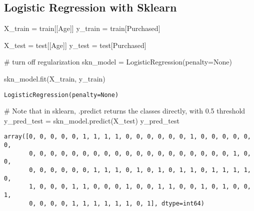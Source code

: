 \documentclass[
  letterpaper,
  DIV=11,
  numbers=noendperiod]{scrreprt}
\newenvironment{Shaded}{\begin{snugshade}}{\end{snugshade}}
\newcommand{\CommentTok}[1]{\textcolor[rgb]{0.37,0.37,0.37}{#1}}
\newcommand{\NormalTok}[1]{\textcolor[rgb]{0.00,0.23,0.31}{#1}}
\newcommand{\OperatorTok}[1]{\textcolor[rgb]{0.37,0.37,0.37}{#1}}
\newcommand{\StringTok}[1]{\textcolor[rgb]{0.13,0.47,0.30}{#1}}
\newcommand{\VariableTok}[1]{\textcolor[rgb]{0.07,0.07,0.07}{#1}}
\begin{document}
\subsection{Logistic Regression with
Sklearn}\label{logistic-regression-with-sklearn}

\begin{Shaded}
\begin{Highlighting}[]
\NormalTok{X\_train }\OperatorTok{=}\NormalTok{ train[[}\StringTok{\textquotesingle{}Age\textquotesingle{}}\NormalTok{]]}
\NormalTok{y\_train }\OperatorTok{=}\NormalTok{ train[}\StringTok{\textquotesingle{}Purchased\textquotesingle{}}\NormalTok{]}

\NormalTok{X\_test }\OperatorTok{=}\NormalTok{ test[[}\StringTok{\textquotesingle{}Age\textquotesingle{}}\NormalTok{]]}
\NormalTok{y\_test }\OperatorTok{=}\NormalTok{ test[}\StringTok{\textquotesingle{}Purchased\textquotesingle{}}\NormalTok{]}
\end{Highlighting}
\end{Shaded}

\begin{Shaded}
\begin{Highlighting}[]
\CommentTok{\# turn off regularization}
\NormalTok{skn\_model }\OperatorTok{=}\NormalTok{ LogisticRegression(penalty}\OperatorTok{=}\VariableTok{None}\NormalTok{)}
\end{Highlighting}
\end{Shaded}

\begin{Shaded}
\begin{Highlighting}[]
\NormalTok{skn\_model.fit(X\_train, y\_train)}
\end{Highlighting}
\end{Shaded}

\begin{verbatim}
LogisticRegression(penalty=None)
\end{verbatim}

\begin{Shaded}
\begin{Highlighting}[]
\CommentTok{\# Note that in sklearn, .predict returns the classes directly, with 0.5 threshold}
\NormalTok{y\_pred\_test }\OperatorTok{=}\NormalTok{ skn\_model.predict(X\_test)}
\NormalTok{y\_pred\_test}
\end{Highlighting}
\end{Shaded}

\begin{verbatim}
array([0, 0, 0, 0, 0, 1, 1, 1, 1, 0, 0, 0, 0, 0, 0, 1, 0, 0, 0, 0, 0, 0,
       0, 0, 0, 0, 0, 0, 0, 0, 0, 0, 0, 0, 0, 0, 0, 0, 0, 0, 0, 1, 0, 0,
       0, 0, 0, 0, 0, 0, 1, 1, 1, 0, 1, 0, 1, 0, 1, 1, 0, 1, 1, 1, 1, 0,
       1, 0, 0, 0, 1, 1, 0, 0, 0, 1, 0, 0, 1, 1, 0, 0, 1, 0, 1, 0, 0, 1,
       0, 0, 0, 0, 1, 1, 1, 1, 1, 1, 0, 1], dtype=int64)
\end{verbatim}
\end{document}
